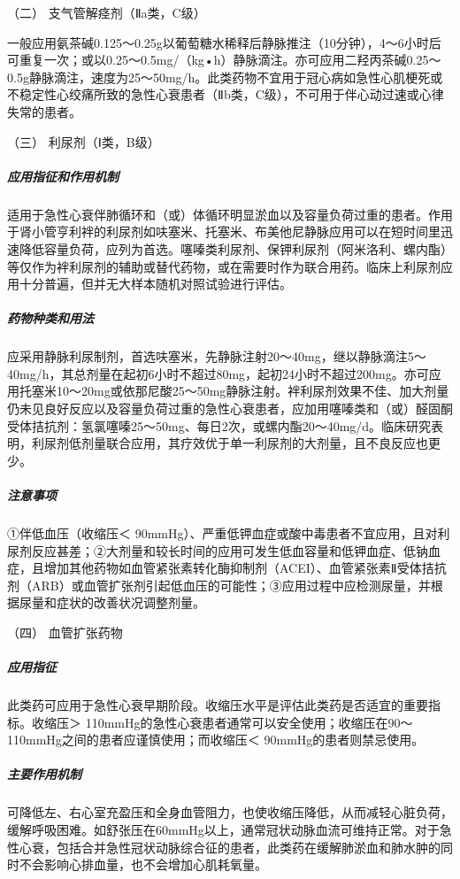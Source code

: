 \hypertarget{text00071.htmlux5cux23CHP3-2-5-5-4-2}{}
（二） 支气管解痉剂（Ⅱa类，C级）

一般应用氨茶碱0.125～0.25g以葡萄糖水稀释后静脉推注（10分钟），4～6小时后可重复一次；或以0.25～0.5mg/（kg•h）静脉滴注。亦可应用二羟丙茶碱0.25～0.5g静脉滴注，速度为25～50mg/h。此类药物不宜用于冠心病如急性心肌梗死或不稳定性心绞痛所致的急性心衰患者（Ⅱb类，C级），不可用于伴心动过速或心律失常的患者。

\hypertarget{text00071.htmlux5cux23CHP3-2-5-5-4-3}{}
（三） 利尿剂（Ⅰ类，B级）

\subparagraph{应用指征和作用机制}

适用于急性心衰伴肺循环和（或）体循环明显淤血以及容量负荷过重的患者。作用于肾小管亨利袢的利尿剂如呋塞米、托塞米、布美他尼静脉应用可以在短时间里迅速降低容量负荷，应列为首选。噻嗪类利尿剂、保钾利尿剂（阿米洛利、螺内酯）等仅作为袢利尿剂的辅助或替代药物，或在需要时作为联合用药。临床上利尿剂应用十分普遍，但并无大样本随机对照试验进行评估。

\subparagraph{药物种类和用法}

应采用静脉利尿制剂，首选呋塞米，先静脉注射20～40mg，继以静脉滴注5～40mg/h，其总剂量在起初6小时不超过80mg，起初24小时不超过200mg。亦可应用托塞米10～20mg或依那尼酸25～50mg静脉注射。袢利尿剂效果不佳、加大剂量仍未见良好反应以及容量负荷过重的急性心衰患者，应加用噻嗪类和（或）醛固酮受体拮抗剂：氢氯噻嗪25～50mg、每日2次，或螺内酯20～40mg/d。临床研究表明，利尿剂低剂量联合应用，其疗效优于单一利尿剂的大剂量，且不良反应也更少。

\subparagraph{注意事项}

①伴低血压（收缩压＜
90mmHg）、严重低钾血症或酸中毒患者不宜应用，且对利尿剂反应甚差；②大剂量和较长时间的应用可发生低血容量和低钾血症、低钠血症，且增加其他药物如血管紧张素转化酶抑制剂（ACEI）、血管紧张素Ⅱ受体拮抗剂（ARB）或血管扩张剂引起低血压的可能性；③应用过程中应检测尿量，并根据尿量和症状的改善状况调整剂量。

\hypertarget{text00071.htmlux5cux23CHP3-2-5-5-4-4}{}
（四） 血管扩张药物

\subparagraph{应用指征}

此类药可应用于急性心衰早期阶段。收缩压水平是评估此类药是否适宜的重要指标。收缩压＞
110mmHg的急性心衰患者通常可以安全使用；收缩压在90～110mmHg之间的患者应谨慎使用；而收缩压＜
90mmHg的患者则禁忌使用。

\subparagraph{主要作用机制}

可降低左、右心室充盈压和全身血管阻力，也使收缩压降低，从而减轻心脏负荷，缓解呼吸困难。如舒张压在60mmHg以上，通常冠状动脉血流可维持正常。对于急性心衰，包括合并急性冠状动脉综合征的患者，此类药在缓解肺淤血和肺水肿的同时不会影响心排血量，也不会增加心肌耗氧量。

